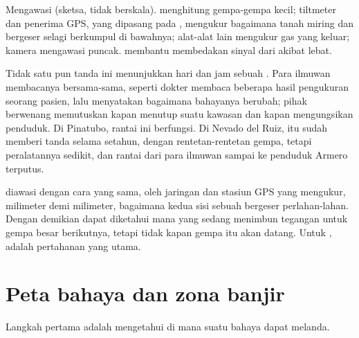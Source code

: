 \begin{omfigure}
{\small Mengawasi  (sketsa, tidak berskala). 
menghitung gempa-gempa kecil; tiltmeter dan penerima GPS, yang dipasang
pada , mengukur bagaimana tanah miring dan bergeser selagi 
berkumpul di bawahnya; alat-alat lain mengukur gas yang keluar; kamera
mengawasi puncak.  membantu membedakan sinyal 
dari akibat  lebat.}
\label{fig:g9:natural-risks:monitoring}
\end{omfigure}

Tidak satu pun tanda ini menunjukkan hari dan jam sebuah . Para
ilmuwan membacanya bersama-sama, seperti dokter membaca beberapa hasil
pengukuran seorang pasien, lalu menyatakan bagaimana bahayanya berubah;
pihak berwenang memutuskan kapan menutup suatu kawasan dan kapan
mengungsikan penduduk. Di Pinatubo, rantai ini berfungsi. Di Nevado del
Ruiz,  itu sudah memberi tanda selama setahun, dengan
rentetan-rentetan gempa, tetapi peralatannya sedikit, dan rantai dari
para ilmuwan sampai ke penduduk Armero terputus.

 diawasi dengan cara yang sama, oleh jaringan  dan
stasiun GPS yang mengukur, milimeter demi milimeter, bagaimana kedua sisi
sebuah  bergeser perlahan-lahan. Dengan demikian dapat diketahui
 mana yang sedang menimbun tegangan untuk gempa besar berikutnya,
tetapi tidak kapan gempa itu akan datang. Untuk , 
adalah pertahanan yang utama.

\section{Peta bahaya dan zona banjir}

Langkah pertama  adalah mengetahui di mana suatu bahaya dapat melanda.


